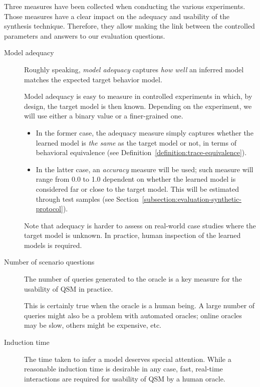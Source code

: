 Three measures have been collected when conducting the various experiments. Those measures have a clear impact on the adequacy and usability of the synthesis technique. Therefore, they allow making the link between the controlled parameters and answers to our evaluation questions.
\begin{description}
\item[Model adequacy] Roughly speaking, \emph{model adequacy} captures \emph{how well} an inferred model matches the expected target behavior model. 

Model adequacy is easy to measure in controlled experiments in which, by design, the target model is then known. Depending on the experiment, we will use either a binary value or a finer-grained one.
\begin{itemize}
\item In the former case, the adequacy measure simply captures whether the learned model is \emph{the same} as the target model or not, in terms of behavioral equivalence (see Definition~\ref{definition:trace-equivalence}).
\item In the latter case, an \emph{accuracy} measure will be used; such measure will range from 0.0 to 1.0 dependent on whether the learned model is considered far or close to the target model. This will be estimated through test samples (see Section~\ref{subsection:evaluation-synthetic-protocol}).
\end{itemize}
Note that adequacy is harder to assess on real-world case studies where the target model is unknown. In practice, human inspection of the learned models is required.

\item[Number of scenario questions] The number of queries generated to the oracle is a key measure for the usability of QSM in practice. 

This is certainly true when the oracle is a human being. A large number of queries might also be a problem with automated oracles; online oracles may be slow, others might be expensive, etc.

\item[Induction time] The time taken to infer a model deserves special attention. While a reasonable induction time is desirable in any case, fast, real-time interactions are required for usability of QSM by a human oracle.
\end{description}

